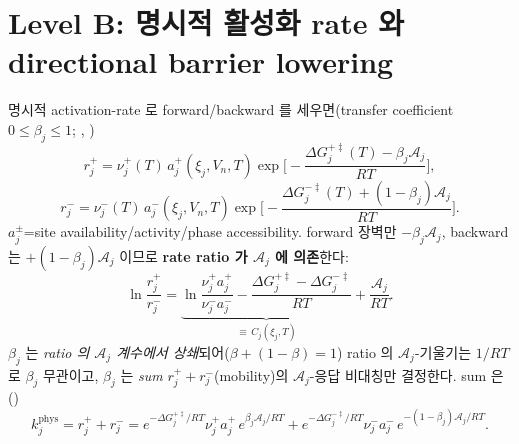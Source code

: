 \section{Level B: 명시적 활성화 rate 와 directional barrier lowering}\label{sec:ch3_levelB}
명시적 activation-rate 로 forward/backward 를 세우면(transfer coefficient $0\le\beta_j\le1$;
\cite{evanspolanyi1938,bardfaulkner,bazant2013}, )
\begin{equation}
r_j^+=\nu_j^+(T)\,a_j^+(\xi_j,V_n,T)\exp\!\Big[-\frac{\Delta G_j^{+\ddagger}(T)-\beta_j\mathcal A_j}{RT}\Big],
\label{eq:ch3_rplus}
\end{equation}
\begin{equation}
r_j^-=\nu_j^-(T)\,a_j^-(\xi_j,V_n,T)\exp\!\Big[-\frac{\Delta G_j^{-\ddagger}(T)+(1-\beta_j)\mathcal A_j}{RT}\Big].
\label{eq:ch3_rminus}
\end{equation}
$a_j^\pm$=site availability/activity/phase accessibility. forward 장벽만 $-\beta_j\mathcal A_j$, backward 는
$+(1-\beta_j)\mathcal A_j$ 이므로 \textbf{rate ratio 가 $\mathcal A_j$ 에 의존}한다:
\begin{equation}
\ln\frac{r_j^+}{r_j^-}=\underbrace{\ln\frac{\nu_j^+a_j^+}{\nu_j^-a_j^-}-\frac{\Delta G_j^{+\ddagger}-\Delta G_j^{-\ddagger}}{RT}}_{\equiv\,C_j(\xi_j,T)}
+\frac{\mathcal A_j}{RT}.
\label{eq:ch3_ratio_B}
\end{equation}
$\beta_j$ 는 \emph{ratio 의 $\mathcal A_j$ 계수에서 상쇄}되어($\beta+(1-\beta)=1$) ratio 의
$\mathcal A_j$-기울기는 $1/RT$ 로 $\beta_j$ 무관이고, $\beta_j$ 는 \emph{sum} $r_j^++r_j^-$(mobility)의
$\mathcal A_j$-응답 비대칭만 결정한다. sum 은()
\begin{equation}
k_j^{\mathrm{phys}}=r_j^++r_j^-
=e^{-\Delta G_j^{+\ddagger}/RT}\nu_j^+a_j^+\,e^{\beta_j\mathcal A_j/RT}
+e^{-\Delta G_j^{-\ddagger}/RT}\nu_j^-a_j^-\,e^{-(1-\beta_j)\mathcal A_j/RT}.
\label{eq:ch3_ksum}
\end{equation}

